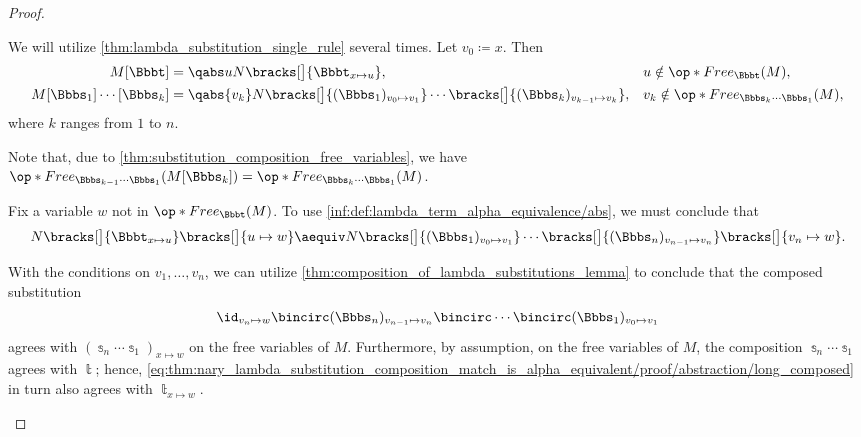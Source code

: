 \begin{proof}
\begin{itemize}
    We will utilize \cref{thm:lambda_substitution_single_rule} several times. Let \( v_0 \coloneqq x \). Then
    \begin{align*}
      M[\Bbbt]                    &= \qabs u N\bracks[\big]{ \Bbbt_{x \mapsto u} },                                                                     &&u \notin \op*{Free}_\Bbbt(M), \\
      M[\Bbbs_1] \cdots [\Bbbs_k] &= \qabs {v_k} N\bracks[\big]{ (\Bbbs_1)_{v_0 \mapsto v_1} } \cdots \bracks[\big]{ (\Bbbs_k)_{v_{k-1} \mapsto v_k} }, &&v_k \notin \op*{Free}_{\Bbbs_k \cdots \Bbbs_1}(M),
    \end{align*}
    where \( k \) ranges from \( 1 \) to \( n \).

    Note that, due to \cref{thm:substitution_composition_free_variables}, we have \( \op*{Free}_{\Bbbs_{k-1} \cdots \Bbbs_1}(M[\Bbbs_k]) = \op*{Free}_{\Bbbs_k \cdots \Bbbs_1}(M) \).

    Fix a variable \( w \) not in \( \op*{Free}_\Bbbt(M) \). To use \ref{inf:def:lambda_term_alpha_equivalence/abs}, we must conclude that
    \begin{equation}\label{eq:thm:nary_lambda_substitution_composition_match_is_alpha_equivalent/proof/abstraction/goal}
      N\bracks[\big]{ \Bbbt_{x \mapsto u} }\bracks[\big]{ u \mapsto w } \aequiv N\bracks[\big]{ (\Bbbs_1)_{v_0 \mapsto v_1} } \cdots \bracks[\big]{ (\Bbbs_n)_{v_{n-1} \mapsto v_n} } \bracks[\big]{ v_n \mapsto w }.
    \end{equation}

    With the conditions on \( v_1, \ldots, v_n \), we can utilize \cref{thm:composition_of_lambda_substitutions_lemma} to conclude that the composed substitution
    \begin{equation}\label{eq:thm:nary_lambda_substitution_composition_match_is_alpha_equivalent/proof/abstraction/long_composed}
      \id_{v_n \mapsto w} \bincirc (\Bbbs_n)_{v_{n-1} \mapsto v_n} \bincirc \cdots \bincirc (\Bbbs_1)_{v_0 \mapsto v_1}
    \end{equation}
    agrees with \( (\Bbbs_n \cdots \Bbbs_1)_{x \mapsto w} \) on the free variables of \( M \). Furthermore, by assumption, on the free variables of \( M \), the composition \( \Bbbs_n \cdots \Bbbs_1 \) agrees with \( \Bbbt \); hence, \eqref{eq:thm:nary_lambda_substitution_composition_match_is_alpha_equivalent/proof/abstraction/long_composed} in turn also agrees with \( \Bbbt_{x \mapsto w} \).


\end{itemize}
\end{proof}
